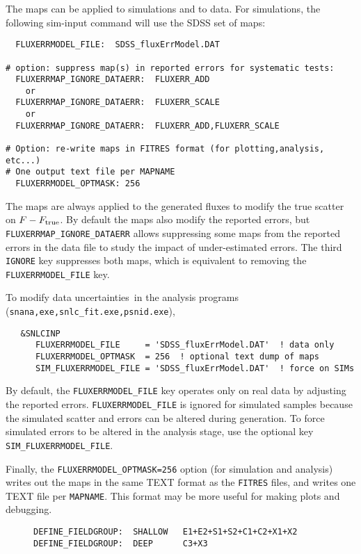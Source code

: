 \documentclass[12pt]{article}
\newcommand{\uncs}{uncertainties}
\begin{document}
{The maps can be applied to simulations and to data.
For simulations, 
the following sim-input command will use the SDSS set of maps:
\clearpage
\begin{verbatim}
  FLUXERRMODEL_FILE:  SDSS_fluxErrModel.DAT

# option: suppress map(s) in reported errors for systematic tests:
  FLUXERRMAP_IGNORE_DATAERR:  FLUXERR_ADD   
    or
  FLUXERRMAP_IGNORE_DATAERR:  FLUXERR_SCALE
    or
  FLUXERRMAP_IGNORE_DATAERR:  FLUXERR_ADD,FLUXERR_SCALE

# Option: re-write maps in FITRES format (for plotting,analysis, etc...)
# One output text file per MAPNAME
  FLUXERRMODEL_OPTMASK: 256 
\end{verbatim}
% 
The maps are always applied to the generated fluxes to modify
the true scatter on $F-F_{\rm true}$. By default the maps 
also modify the reported errors,
but {\tt FLUXERRMAP\_IGNORE\_DATAERR} allows suppressing
some maps from the reported errors in the data file to 
study the impact of under-estimated errors.
The third {\tt IGNORE} key suppresses both maps, which
is equivalent to removing the {\tt FLUXERRMODEL\_FILE} key.

To modify data \uncs\ in the analysis programs
({\tt snana,exe,snlc\_fit.exe,psnid.exe}),
\begin{verbatim}
   &SNLCINP
      FLUXERRMODEL_FILE     = 'SDSS_fluxErrModel.DAT'  ! data only
      FLUXERRMODEL_OPTMASK  = 256  ! optional text dump of maps
      SIM_FLUXERRMODEL_FILE = 'SDSS_fluxErrModel.DAT'  ! force on SIMs
\end{verbatim}
%
By default, the {\tt FLUXERRMODEL\_FILE} key operates only on real data
by adjusting the reported errors.  
{\tt FLUXERRMODEL\_FILE} is ignored for simulated samples because 
the simulated scatter and errors can be altered during generation.
To force simulated errors to be altered in the analysis stage, use
the optional key {\tt SIM\_FLUXERRMODEL\_FILE}.

Finally, the {\tt FLUXERRMODEL\_OPTMASK=256} option 
(for simulation and analysis) writes out the maps
in the same TEXT format as the {\tt FITRES} files,
and writes one TEXT file per {\tt MAPNAME}.
This format may be more useful for making plots and debugging.

\begin{figure} [hb] 
\begin{center}
\begin{Verbatim}[frame=single]
DEFINE_FIELDGROUP:  SHALLOW   E1+E2+S1+S2+C1+C2+X1+X2 
DEFINE_FIELDGROUP:  DEEP      C3+X3


\end{Verbatim}
\end{center}
\end{figure}}
\end{document}
